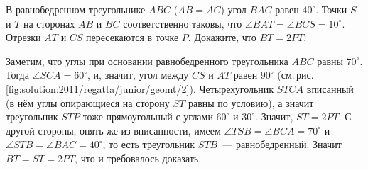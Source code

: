 \problem
В равнобедренном треугольнике $ABC$ ($AB = AC$) угол $BAC$ равен $40^\circ$.
Точки $S$ и $T$ на сторонах $AB$ и $BC$ соответственно таковы, что
$\angle BAT = \angle BCS = 10^\circ$.
Отрезки $AT$ и $CS$ пересекаются в точке $P$.
Докажите, что $BT = 2 PT$.

%
\label{solution:2011/regatta/junior/geomt/2}%
Заметим, что углы при основании равнобедренного треугольника $ABC$ равны
$70^\circ$.
Тогда $\angle SCA = 60^\circ$, и, значит, угол между $CS$ и $AT$ равен
$90^\circ$
(см.\,рис.\,\ref{fig:solution:2011/regatta/junior/geomt/2}).
Четырехугольник $STCA$ вписанный
(в нём углы опирающиеся на сторону $ST$ равны по условию),
а значит треугольник $STP$ тоже прямоугольный с углами $60^\circ$ и $30^\circ$.
Значит, $ST = 2 PT$.
С другой стороны, опять же из вписанности, имеем
$\angle TSB = \angle BCA = 70^\circ$ и
$\angle STB = \angle BAC = 40^\circ$,
то есть треугольник $STB$~--- равнобедренный.
Значит $BT = ST = 2 PT$, что и требовалось доказать.

\endproblem
